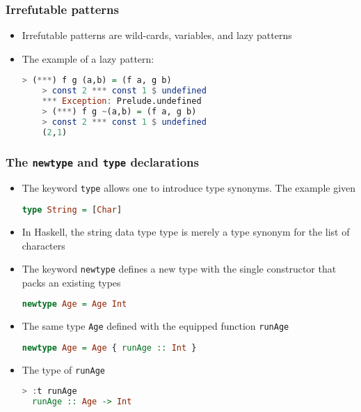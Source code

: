 \documentclass[10pt,pdf,utf8,russian,aspectratio=169]{beamer}
\begin{document}
\begin{frame}[fragile]
  \frametitle{Irrefutable patterns}
  \begin{itemize}
    \item Irrefutable patterns are wild-cards, variables, and lazy patterns
    \item The example of a lazy pattern:
    \begin{lstlisting}[language=Haskell]
    > (***) f g (a,b) = (f a, g b)
    > const 2 *** const 1 $ undefined
    *** Exception: Prelude.undefined
    > (***) f g ~(a,b) = (f a, g b)
    > const 2 *** const 1 $ undefined
    (2,1)
    \end{lstlisting}
  \end{itemize}
\end{frame}

\begin{frame}[fragile]
\frametitle{The \verb"newtype" and \verb"type" declarations}

\begin{itemize}
  \item The keyword \verb"type" allows one to introduce type synonyms. The example given
  \begin{lstlisting}[language=Haskell]
  type String = [Char]
  \end{lstlisting}
  \item In Haskell, the string data type type is merely a type synonym for the list of characters
  \item The keyword \verb"newtype" defines a new type with the single constructor that packs an existing types
  \begin{lstlisting}[language=Haskell]
  newtype Age = Age Int
  \end{lstlisting}
  \item The same type \verb"Age" defined with the equipped function \verb"runAge"
  \begin{lstlisting}[language=Haskell]
  newtype Age = Age { runAge :: Int }
  \end{lstlisting}
  \item The type of \verb"runAge"
  \begin{lstlisting}[language=Haskell]
  > :t runAge
  runAge :: Age -> Int
  \end{lstlisting}
\end{itemize}
\end{frame}
\end{document}
